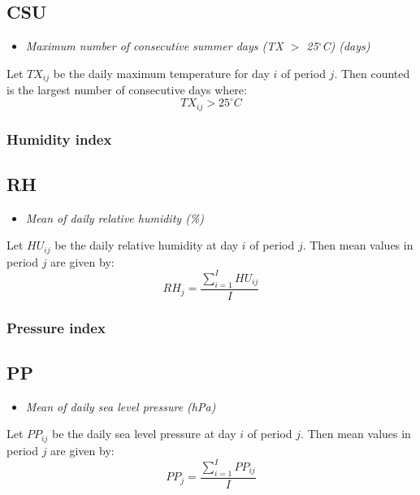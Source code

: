 \documentclass[a4paper,11pt]{article}
\begin{document}
\subsection*{CSU}
\begin{itemize}
\item \textit{Maximum number of consecutive summer days (TX $>$ 25$^\circ$C) (days)}
\end{itemize}
Let $TX_{ij}$ be the daily maximum temperature for day $i$ of period
$j$. Then counted is the largest number of consecutive days where:
\begin{equation*}
TX_{ij} > 25^\circ C
\end{equation*}


\subsubsection{Humidity index}

\subsection*{RH}
\begin{itemize}
\item \textit{Mean of daily relative humidity (\%)}
\end{itemize}
Let $HU_{ij}$ be the daily relative humidity at day $i$ of period
$j$. Then mean values in period $j$ are given by:
\begin{equation*}
RH_{j} = \frac{\sum_{i=1}^{I} HU_{ij}}{I}
\end{equation*}



\subsubsection{Pressure index}

\subsection*{PP}
\begin{itemize}
\item \textit{Mean of daily sea level pressure (hPa)}
\end{itemize}
Let $PP_{ij}$ be the daily sea level pressure at day $i$ of period
$j$. Then mean values in period $j$ are given by:
\begin{equation*}
PP_{j} = \frac{\sum_{i=1}^{I} PP_{ij}}{I}
\end{equation*}
\end{document}
